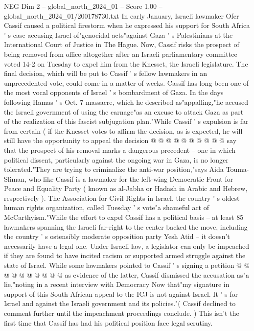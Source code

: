 \begin{textsample}{NEG Dim 2 – global\_north\_2024\_01 – Score 1.00 – global\_north\_2024\_01/200178730.txt}  \label{ex:f2_neg_334}
In early January, Israeli lawmaker Ofer Cassif caused a political firestorm when he expressed his support for South Africa ' s case accusing Israel of"genocidal acts"against Gaza ' s Palestinians at the International Court of Justice in The Hague.
Now, Cassif risks the prospect of being removed from office altogether after an Israeli parliamentary committee voted 14-2 on Tuesday to expel him from the Knesset, the Israeli legislature.
The final decision, which will be put to Cassif ' s fellow lawmakers in an unprecedented vote, could come in a matter of weeks.
Cassif has long been one of the most vocal opponents of Israel ' s bombardment of Gaza.
In the days following Hamas ' s Oct. 7 massacre, which he described as"appalling,"he accused the Israeli government of using the carnage"as an excuse to attack Gaza as part of the realization of this fascist subjugation plan."While Cassif ' s expulsion is far from certain ( if the Knesset votes to affirm the decision, as is expected, he will still have the opportunity to appeal the decision @ @ @ @ @ @ @ @ @ @ say that the prospect of his removal marks a dangerous precedent -- one in which political dissent, particularly against the ongoing war in Gaza, is no longer tolerated."They are trying to criminalize the anti-war position,"says Aida Touma-Sliman, who like Cassif is a lawmaker for the left-wing Democratic Front for Peace and Equality Party ( known as al-Jabha or Hadash in Arabic and Hebrew, respectively ).
The Association for Civil Rights in Israel, the country ' s oldest human rights organization, called Tuesday ' s vote"a shameful act of McCarthyism."While the effort to expel Cassif has a political basis -- at least 85 lawmakers spanning the Israeli far-right to the center backed the move, including the country ' s ostensibly moderate opposition party Yesh Atid -- it doesn't necessarily have a legal one.
Under Israeli law, a legislator can only be impeached if they are found to have incited racism or supported armed struggle against the state of Israel.
While some lawmakers pointed to Cassif ' s signing a petition @ @ @ @ @ @ @ @ @ @ as evidence of the latter, Cassif dismissed the accusation as"a lie,"noting in a recent interview with Democracy Now that"my signature in support of this South African appeal to the ICJ is not against Israel.
It ' s for Israel and against the Israeli government and its policies."( Cassif declined to comment further until the impeachment proceedings conclude. ) This isn't the first time that Cassif has had his political position face legal scrutiny.

\end{textsample}

